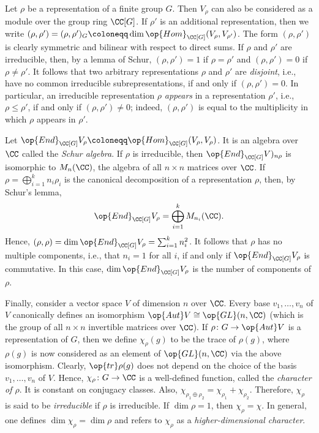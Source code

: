 \documentclass[../main.tex]{subfiles}
\begin{document}
Let $\rho$ be a representation of a finite group $G$. Then $V_\rho$ can also be considered as a module over the group ring $\CC[G]$. If $\rho'$ is an additional representation, then we write $(\rho,\rho')=(\rho,\rho')_G\coloneqq\dim\op{Hom}_{\CC[G]}(V_\rho,V_{\rho'})$. The form $(\rho,\rho')$ is clearly symmetric and bilinear with respect to direct sums. If $\rho$ and $\rho'$ are irreducible, then, by a lemma of Schur, $(\rho,\rho')=1$ if $\rho=\rho'$ and $(\rho,\rho')=0$ if $\rho\ne\rho'$. It follows that two arbitrary representations $\rho$ and $\rho'$ are \textit{disjoint}, i.e., have no common irreducible subrepresentations, if and only if $(\rho,\rho')=0$. In particular, an irreducible representation $\rho$ \textit{appears} in a representation $\rho'$, i.e., $\rho\le\rho'$, if and only if $(\rho,\rho')\ne0$; indeed, $(\rho,\rho')$ is equal to the multiplicity in which $\rho$ appears in $\rho'$.

Let $\op{End}_{\CC[G]}V_\rho\coloneqq\op{Hom}_{\CC[G]}(V_\rho,V_\rho)$. It is an algebra over $\CC$ called the \textit{Schur algebra}. If $\rho$ is irreducible, then $\op{End}_{\CC[G]}V)_{n\rho}$ is isomorphic to $M_n(\CC)$, the algebra of all $n\times n$ matrices over $\CC$. If $\rho=\bigoplus_{i=1}^kn_i\rho_i$ is the canonical decomposition of a representation $\rho$, then, by Schur's lemma,
\[\op{End}_{\CC[G]}V_\rho=\bigoplus_{i=1}^kM_{n_i}(\CC).\]
Hence, $(\rho,\rho)=\dim\op{End}_{\CC[G]}V_\rho=\sum_{i=1}^kn_i^2$. It follows that $\rho$ has no multiple components, i.e., that $n_i=1$ for all $i$, if and only if $\op{End}_{\CC[G]}V_\rho$ is commutative. In this case, $\dim\op{End}_{\CC[G]}V_\rho$ is the number of components of $\rho$.

Finally, consider a vector space $V$ of dimension $n$ over $\CC$. Every base $v_1,\ldots,v_n$ of $V$ canonically defines an isomorphism $\op{Aut}V\cong\op{GL}(n,\CC)$ (which is the group of all $n\times n$ invertible matrices over $\CC$). If $\rho\colon G\to\op{Aut}V$ is a representation of $G$, then we define $\chi_\rho(g)$ to be the trace of $\rho(g)$, where $\rho(g)$ is now considered as an element of $\op{GL}(n,\CC)$ via the above isomorphism. Clearly, $\op{tr}\rho(g)$ does not depend on the choice of the basis $v_1,\ldots,v_n$ of $V$. Hence, $\chi_\rho\colon G\to\CC$ is a well-defined function, called the \textit{character of $\rho$}. It is constant on conjugacy classes. Also, $\chi_{\rho_1\oplus\rho_2}=\chi_{\rho_1}+\chi_{\rho_2}$. Therefore, $\chi_\rho$ is said to be \textit{irreducible} if $\rho$ is irreducible. If $\dim\rho=1$, then $\chi_\rho=\chi$. In general, one defines $\dim\chi_\rho=\dim\rho$ and refers to $\chi_\rho$ as a \textit{higher-dimensional character}.
\end{document}

